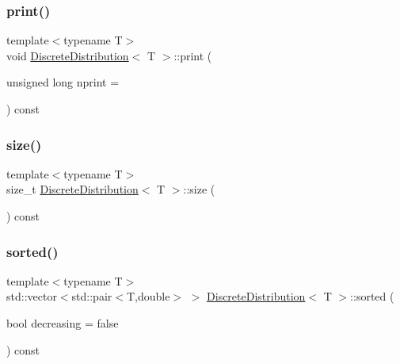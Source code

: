 \mbox{\label{class_discrete_distribution_a58bc689015e6b594ed1a53130758ba6f}} 
\subsubsection{\texorpdfstring{print()}{print()}\hspace{0.1cm}{\footnotesize\ttfamily [2/2]}}
{\footnotesize\ttfamily template$<$typename T$>$ \\
void \hyperlink{class_discrete_distribution}{Discrete\+Distribution}$<$ T $>$\+::print (\begin{DoxyParamCaption}\item[{unsigned long}]{nprint = {} }\end{DoxyParamCaption}) const\hspace{0.3cm}{\ttfamily [inline]}}

\mbox{\label{class_discrete_distribution_ad74207d32c2ed6c5c26b3f991f4fedba}} 
\subsubsection{\texorpdfstring{size()}{size()}}
{\footnotesize\ttfamily template$<$typename T$>$ \\
size\+\_\+t \hyperlink{class_discrete_distribution}{Discrete\+Distribution}$<$ T $>$\+::size (\begin{DoxyParamCaption}{ }\end{DoxyParamCaption}) const\hspace{0.3cm}{\ttfamily [inline]}}

\mbox{\label{class_discrete_distribution_a94488cfd094f6cde47f15a1f4c7cdbb9}} 
\subsubsection{\texorpdfstring{sorted()}{sorted()}}
{\footnotesize\ttfamily template$<$typename T$>$ \\
std\+::vector$<$std\+::pair$<$T,double$>$ $>$ \hyperlink{class_discrete_distribution}{Discrete\+Distribution}$<$ T $>$\+::sorted (\begin{DoxyParamCaption}\item[{bool}]{decreasing = {\ttfamily false} }\end{DoxyParamCaption}) const\hspace{0.3cm}{\ttfamily [inline]}}

